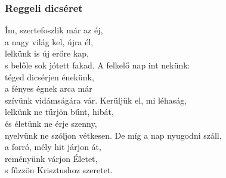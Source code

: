 \documentclass[twoside]{article}
\begin{document}

\subsubsection*{Reggeli dicséret}



\begin{hymnstanzas}
    Ím, szertefoszlik már az éj,\\
    a nagy világ kel, újra él,\\
    lelkünk is új erőre kap,\\
    s belőle sok jótett fakad.
\stanzabreak
    A felkelő nap int nekünk:\\
    téged dicsérjen énekünk,\\
    a fényes égnek arca már\\
    szívünk vidámságára vár.
\stanzabreak
    Kerüljük el, mi léhaság,\\
    lelkünk ne tűrjön bűnt, hibát,\\
    és életünk ne érje szenny,\\
    nyelvünk ne szóljon vétkesen.
\stanzabreak
    De míg a nap nyugodni száll,\\
    a forró, mély hit járjon át,\\
    reményünk várjon Életet,\\
    s fűzzön Krisztushoz szeretet.
\end{hymnstanzas}



\end{document}
